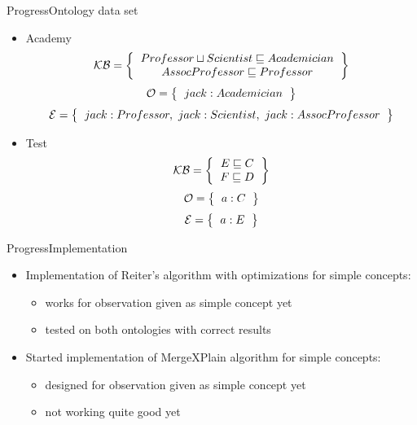 \documentclass{beamer}
\begin{document}
\begin{frame}{Progress}{Ontology data set}
	\begin{itemize}
		\item { Academy
			\[ 
			\mathcal{KB} = \left\{
			\begin{tabular}{c c}
			$Professor \sqcup Scientist \sqsubseteq Academician$ \\
			$AssocProfessor \sqsubseteq Professor$ \\
			\end{tabular}
			\right \}
			\]
			\[ 
			\mathcal{O} = \left\{
			\begin{tabular}{c c}
			$jack : Academician$ \\
			\end{tabular}
			\right \}
			\]		
			\[ 
			\mathcal{E} = \left\{
			\begin{tabular}{c c}
			$jack : Professor, \text{ } jack : Scientist, \text{ } jack : AssocProfessor$ \\
			\end{tabular}
			\right \}
			\]										
		}

		\item { Test
			\[ 
			\mathcal{KB} = \left\{
			\begin{tabular}{c c}
			$E \sqsubseteq C$ \\
			$F \sqsubseteq D$ \\
			\end{tabular}
			\right \}
			\]
			\[ 
			\mathcal{O} = \left\{
			\begin{tabular}{c c}
			$a : C$ \\
			\end{tabular}
			\right \}
			\]			
			\[ 
			\mathcal{E} = \left\{
			\begin{tabular}{c c}
			$a : E$ \\
			\end{tabular}
			\right \}
			\]										
		}
	\end{itemize}
\end{frame}

\begin{frame}{Progress}{Implementation}
	\begin{itemize}
		\item Implementation of Reiter's algorithm with optimizations for simple concepts:

		\begin{itemize}
			\item works for observation given as simple concept yet
			\item tested on both ontologies with correct results
		\end{itemize}		

		\item Started implementation of MergeXPlain algorithm for simple concepts:

		\begin{itemize}
			\item designed for observation given as simple concept yet
			\item not working quite good yet
		\end{itemize}
	\end{itemize}
\end{frame}
\end{document}
